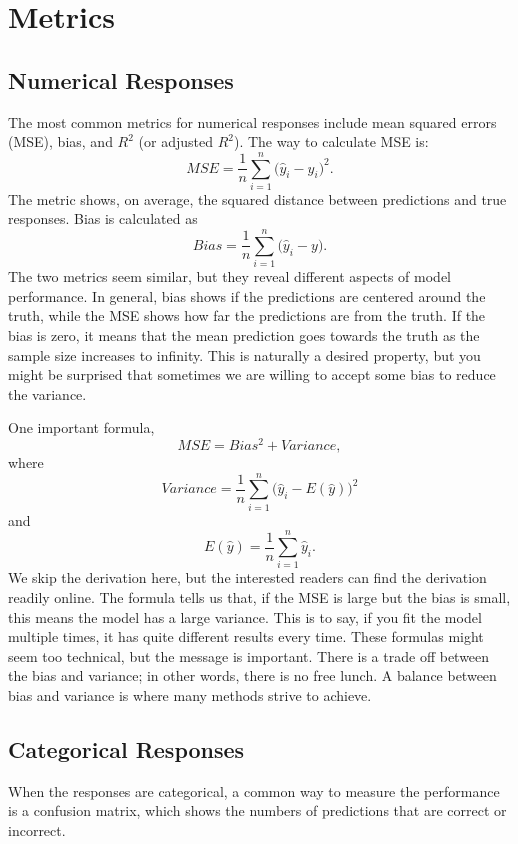 \documentclass[
]{book}
\begin{document}
\hypertarget{metrics}{%
\section{Metrics}\label{metrics}}

\hypertarget{numerical-responses}{%
\subsection{Numerical Responses}\label{numerical-responses}}

The most common metrics for numerical responses include mean squared errors (MSE), bias, and \(R^2\) (or adjusted \(R^2\)). The way to calculate MSE is:
\[MSE = \frac{1}{n} \sum_{i=1}^n \bigg( \hat{y}_i - y_i \bigg)^2.\]
The metric shows, on average, the squared distance between predictions and true responses. Bias is calculated as
\[Bias = \frac{1}{n} \sum_{i=1}^n \bigg( \hat{y}_i - y \bigg).\]
The two metrics seem similar, but they reveal different aspects of model performance. In general, bias shows if the predictions are centered around the truth, while the MSE shows how far the predictions are from the truth. If the bias is zero, it means that the mean prediction goes towards the truth as the sample size increases to infinity. This is naturally a desired property, but you might be surprised that sometimes we are willing to accept some bias to reduce the variance.

One important formula,
\[MSE = Bias^2 + Variance,\]
where
\[Variance = \frac{1}{n} \sum_{i=1}^n \bigg( \hat{y}_i - E(\hat{y}) \bigg)^2\]
and
\[E(\hat{y}) = \frac{1}{n} \sum_{i=1}^n \hat{y}_i.\]
We skip the derivation here, but the interested readers can find the derivation readily online. The formula tells us that, if the MSE is large but the bias is small, this means the model has a large variance. This is to say, if you fit the model multiple times, it has quite different results every time. These formulas might seem too technical, but the message is important. There is a trade off between the bias and variance; in other words, there is no free lunch. A balance between bias and variance is where many methods strive to achieve.

\hypertarget{categorical-responses}{%
\subsection{Categorical Responses}\label{categorical-responses}}

When the responses are categorical, a common way to measure the performance is a confusion matrix, which shows the numbers of predictions that are correct or incorrect.
\end{document}
